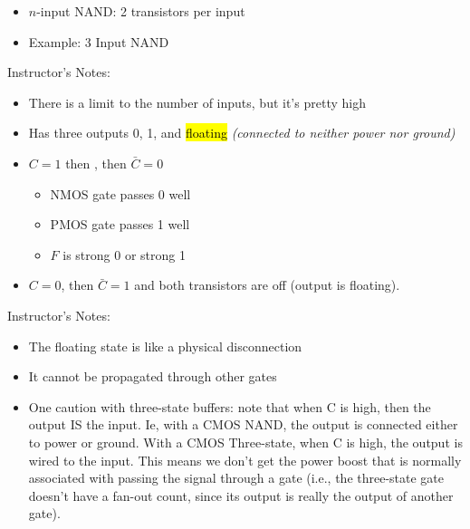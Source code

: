 \begin{frame}[fragile]
\begin{itemize}
\item $n$-input NAND: 2 transistors per input

\item Example: 3 Input NAND
\end{itemize}
\end{frame}
\BNotes\ifnum{}
\begin{frame}[fragile]
Instructor's Notes:
\begin{itemize}
\item There is a limit to the number of inputs, but it's pretty high
\end{itemize}
\end{frame}
\fi\ENotes

\begin{frame}[fragile]
\begin{itemize}
	\item Has three outputs
		0, 1, and \hl{floating} {\em (connected to neither power nor ground)}
	\item $C=1$ then , then $\bar{C}=0$ 
	\begin{itemize}
		\item NMOS gate passes 0 well 
  \item PMOS gate passes 1 well
  \item $F$ is strong 0 or strong 1
	\end{itemize}
	\item $C=0$, then $\bar{C}=1$ and both transistors are off (output is floating).
\end{itemize}
\end{frame}
\BNotes\ifnum{}
\begin{frame}[fragile]
Instructor's Notes:
\begin{itemize}
\item The floating state is like a physical disconnection
\item It cannot be propagated through other gates
\item One caution with three-state buffers: note that when C is high, then
	the output IS the input.  Ie, with a CMOS NAND, the output is connected
	either to power or ground.  With a CMOS Three-state, when C is high,
	the output is wired to the input.  This means we don't get the power
	boost that is normally associated with passing the signal through a
	gate (i.e., the three-state gate doesn't have a fan-out count, since
	its output is really the output of another gate).
\end{itemize}
\end{frame}
\fi\ENotes






